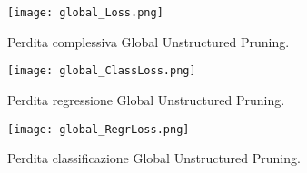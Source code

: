 \begin{figure}
    \centering
    \hspace*{-0.5cm}
    \texttt{[image: global\_Loss.png]}
    \centering
    \caption{Perdita complessiva Global Unstructured Pruning.}
    \label{glob_loss_global_pruning}
\end{figure}
\begin{figure}
    \centering
    \hspace*{-0.5cm}
    \texttt{[image: global\_ClassLoss.png]}
    \centering
    \caption{Perdita regressione Global Unstructured Pruning.}
    \label{glob_loss_class_pruning}
\end{figure}
\begin{figure}
    \centering
    \hspace*{-0.5cm}
    \texttt{[image: global\_RegrLoss.png]}
    \centering
    \caption{Perdita classificazione Global Unstructured Pruning.}
    \label{glob_loss_regr_pruning}
\end{figure}

